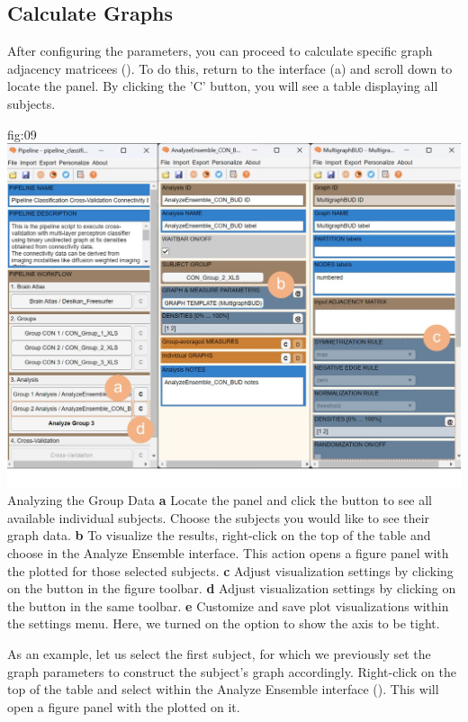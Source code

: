 \documentclass[justified]{tufte-handout}
\begin{document}
{\clearpage
\subsection{Calculate Graphs}
 
After configuring the parameters, you can proceed to calculate specific graph adjacency matricees (). To do this, return to the  interface (a) and scroll down to locate the  panel. By clicking the 'C' button, you will see a table displaying all subjects.

	{fig:09}
	{
	\includegraphics{fig09.jpg}
	}
	{Analyzing the Group Data}
	{
	{\bf a} Locate the  panel and click the  button to see all available individual subjects. Choose the subjects you would like to see their graph data.
	{\bf b} To visualize the results, right-click on the top of the table and choose  in the Analyze Ensemble interface. This action opens a figure panel with the  plotted for those selected subjects.
	{\bf c} Adjust visualization settings by clicking on the  button in the figure toolbar.
	{\bf d} Adjust visualization settings by clicking on the  button in the same toolbar.
	{\bf e} Customize and save plot visualizations within the settings menu. Here, we turned on the option to show the axis to be tight.
	}

As an example, let us select the first subject, for which we previously set the graph parameters to construct the subject's graph accordingly. 
Right-click on the top of the table and select  within the Analyze Ensemble interface (). This will open a figure panel with the  plotted on it.

}
\end{document}
